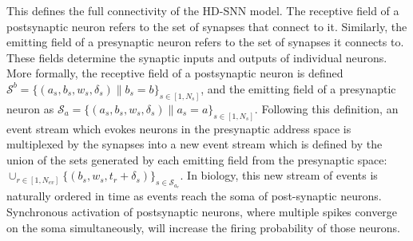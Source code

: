 \documentclass[runningheads]{llncs}
\newcommand{\presynaddr}{a} %
\newcommand{\postsynaddr}{b} %
\newcommand{\numevent}{N_{ev}} %
\newcommand{\arank}{r} %
\newcommand{\synapse}{\mathcal{S}} %
\newcommand{\synapticweight}{w} %
\newcommand{\synapticdelay}{\delta} %
\newcommand{\ranksyn}{s} %
\newcommand{\Nsyn}{N_{s}} %
\newcommand{\timev}{t} %
\begin{document}
This defines the full connectivity of the HD-SNN model. The receptive field of a postsynaptic neuron refers to the set of synapses that connect to it. Similarly, the emitting field of a presynaptic neuron refers to the set of synapses it connects to. These fields determine the synaptic inputs and outputs of individual neurons. More formally, the receptive field of a postsynaptic neuron is defined $\synapse^\postsynaddr =  \{(\presynaddr_\ranksyn, \postsynaddr_\ranksyn, \synapticweight_\ranksyn, \synapticdelay_\ranksyn) \| \postsynaddr_\ranksyn=\postsynaddr\}_{\ranksyn \in [1,\Nsyn]} $, and the emitting field of a presynaptic neuron as $\synapse_\presynaddr =  \{(\presynaddr_\ranksyn, \postsynaddr_\ranksyn, \synapticweight_\ranksyn, \synapticdelay_\ranksyn) \| \presynaddr_\ranksyn=\presynaddr\}_{\ranksyn \in [1,\Nsyn]}$. Following this definition, an event stream which evokes neurons in the presynaptic address space is multiplexed by the synapses into a new event stream which is defined by the union of the sets generated by each emitting field from the presynaptic space: 
$ \cup_{\arank \in [1,\numevent]}  \{(\postsynaddr_\ranksyn, \synapticweight_\ranksyn, \timev_\arank + \synapticdelay_\ranksyn) \}_{ \ranksyn \in \synapse_{\presynaddr_\arank}} $. In biology, this new stream of events is naturally ordered in time as events reach the soma of post-synaptic neurons. %
Synchronous activation of postsynaptic neurons, where multiple spikes converge on the soma simultaneously, will increase the firing probability of those neurons.
\end{document}
